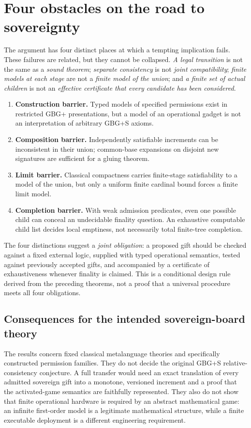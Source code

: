 \documentclass[11pt,letterpaper]{article}
\theoremstyle{definition}\newtheorem{definition}[theorem]{Definition}\newtheorem{example}[theorem]{Example}
\theoremstyle{remark}\newtheorem{remark}[theorem]{Remark}
\begin{document}
\section{Four obstacles on the road to sovereignty}\label{sec:four-barriers}
The argument has four distinct places at which a tempting implication fails.
These failures are related, but they cannot be collapsed. \emph{A legal transition} is not the same as a \emph{sound theorem}; \emph{separate consistency} is not \emph{joint compatibility}; \emph{finite models at each stage} are not a \emph{finite model of the union}; and \emph{a finite set of actual children} is not an \emph{effective certificate that every candidate has been considered}.
\begin{enumerate}[label=\textbf{\arabic*.},leftmargin=2.2em]
\item \textbf{Construction barrier.} Typed models of specified permissions exist in restricted GBG+ presentations, but a model of an operational gadget is not an interpretation of arbitrary GBG+S axioms.
\item \textbf{Composition barrier.} Independently satisfiable increments can be inconsistent in their union; common-base expansions on disjoint new signatures are sufficient for a gluing theorem.
\item \textbf{Limit barrier.} Classical compactness carries finite-stage satisfiability to a model of the union, but only a uniform finite cardinal bound forces a finite limit model.
\item \textbf{Completion barrier.} With weak admission predicates, even one possible child can conceal an undecidable finality question. An exhaustive computable child list decides local emptiness, not necessarily total finite-tree completion.
\end{enumerate}
The four distinctions suggest a \emph{joint obligation}: a proposed gift should be checked against a fixed external logic, supplied with typed operational semantics, tested against previously accepted gifts, and accompanied by a certificate of exhaustiveness whenever finality is claimed. This is a conditional design rule derived from the preceding theorems, not a proof that a universal procedure meets all four obligations.


\subsection{Consequences for the intended sovereign-board theory}
The results concern fixed classical metalanguage theories and specifically constructed permission families. They do not decide the original GBG+S relative-consistency conjecture. A full transfer would need an exact translation of every admitted sovereign gift into a monotone, versioned increment and a proof that the activated-game semantics are faithfully represented. They also do not show that finite operational hardware is required by an abstract mathematical game: an infinite first-order model is a legitimate mathematical structure, while a finite executable deployment is a different engineering requirement.
\end{document}
